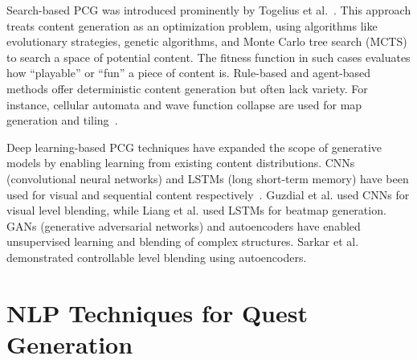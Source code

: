 Search-based PCG was introduced prominently by Togelius et al.~\cite{togelius2011search}. This approach
treats content generation as an optimization problem, using algorithms like evolutionary
strategies, genetic algorithms, and Monte Carlo tree search (MCTS) to search a space of
potential content. The fitness function in such cases evaluates how “playable” or “fun”
a piece of content is. Rule-based and agent-based methods offer deterministic content
generation but often lack variety. For instance, cellular automata and wave function
collapse are used for map generation and tiling~\cite{shaker2016procedural}.

Deep learning-based PCG techniques have expanded the scope of generative models
by enabling learning from existing content distributions. CNNs (convolutional neural
networks) and LSTMs (long short-term memory) have been used for visual and sequential
content respectively~\cite{liu2021deep}. Guzdial et al.\cite{guzdial2017visual} used CNNs for visual level blending, while
Liang et al.\cite{liang2019procedural} used LSTMs for beatmap generation. GANs (generative adversarial
networks) and autoencoders have enabled unsupervised learning and blending of complex
structures. Sarkar et al.~\cite{sarkar2020controllable} demonstrated controllable level blending using autoencoders.

\section{NLP Techniques for Quest Generation}

